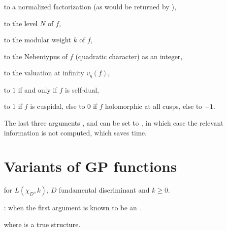 \item {} to a normalized factorization (as would be returned by
),

\item {} to the level $N$ of $f$,

\item {} to the modular weight $k$ of $f$,

\item {} to the Nebentypus of $f$ (quadratic character)
as an integer,

\item {} to the valuation at infinity $v_q(f)$,

\item {} to $1$ if and only if $f$ is self-dual,

\item {} to $1$ if $f$ is cuspidal, else to $0$ if $f$ holomorphic
at all cusps, else to $-1$.

The last three arguments ,  and  can be set to
, in which case the relevant information is not computed, which
saves time.

\section{Variants of GP functions}





 for $L(\chi_D, k)$, $D$ fundamental
discriminant and $k \geq 0$.

:
  when the first argument is known to be an .



 where
 is a true  structure.


